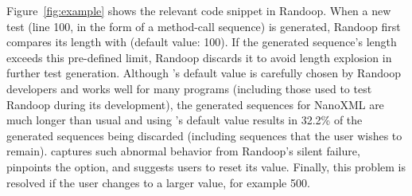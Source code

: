 Figure~\ref{fig:example} shows the relevant code snippet
in Randoop.  When a new test (line 100, in the form of
a method-call sequence) is generated,
Randoop first compares its length with 
(default value: 100). If the
generated sequence's length exceeds this pre-defined limit,
Randoop discards it to avoid length explosion in further
test generation.
Although 's default value is carefully chosen
by Randoop developers
and works well for many programs (including those used to test
Randoop during its development), the generated sequences for NanoXML
are much longer than usual and using 's default value
results in 32.2\% of the generated sequences being discarded
(including sequences that the user wishes to remain).
\ourtool captures such abnormal behavior from Randoop's
silent failure, pinpoints the
 option, and suggests users to reset its value.
Finally, this problem is resolved if
the user changes  to a larger value, for example 500.





